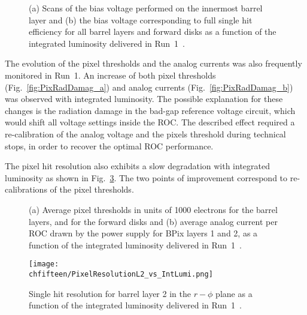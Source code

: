 \begin{figure}[!htb]
 \begin{center}
 \end{center}
 \caption{(a) Scans of the bias voltage performed on the innermost barrel layer and (b) the bias voltage corresponding to full single hit efficiency for all barrel layers and forward disks as a function of the integrated luminosity delivered in Run~1~\cite{Veszpremi:2014hpa}.}
 \label{fig:PixBiasV}
\end{figure}

The evolution of the pixel thresholds and the analog currents was also frequently monitored in Run~1.
An increase of both pixel thresholds (Fig.~\ref{fig:PixRadDamag_a}) and analog currents (Fig.~\ref{fig:PixRadDamag_b}) was observed with integrated luminosity.
The possible explanation for these changes is the radiation damage in the bad-gap reference voltage circuit, which would shift all voltage settings inside the ROC.
The described effect required a re-calibration of the analog voltage and the pixels threshold during technical stops, in order to recover the optimal ROC performance.

The pixel hit resolution also exhibits a slow degradation with integrated luminosity as shown in Fig.~\ref{fig:PixRelvsLumi}. The two points of improvement correspond to re-calibrations of the pixel thresholds.

\begin{figure}[!htb]
 \begin{center}
 \end{center}
 \caption{(a) Average pixel thresholds in units of 1000 electrons for the barrel layers, and for the forward disks and (b) average analog current per ROC drawn by the power supply for BPix layers 1 and 2, as a function of the integrated luminosity delivered in Run~1~\cite{Veszpremi:2014hpa}.}
 \label{fig:PixRadDamag}
\end{figure}

\begin{figure}[!htb]
 \begin{center}
 \texttt{[image: \\chfifteen/PixelResolutionL2\_vs\_IntLumi.png]}
 \end{center}
 \caption{Single hit resolution for barrel layer 2 in the $r-\phi$ plane as a function of the integrated luminosity delivered in Run~1~\cite{Veszpremi:2014hpa}.}
 \label{fig:PixRelvsLumi}
\end{figure}

